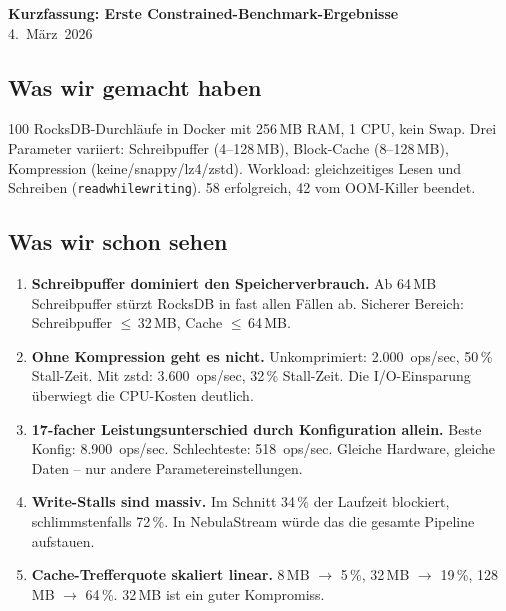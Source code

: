 \documentclass[11pt,a4paper]{scrartcl}
\begin{document}
\begin{center}
  {\Large\bfseries Kurzfassung: Erste Constrained-Benchmark-Ergebnisse}\\[4pt]
  {\normalsize 4.~März~2026}
\end{center}

\bigskip

\subsection*{Was wir gemacht haben}

100 RocksDB-Durchläufe in Docker mit 256\,MB RAM, 1 CPU, kein Swap.
Drei Parameter variiert: Schreibpuffer (4--128\,MB), Block-Cache (8--128\,MB),
Kompression (keine/snappy/lz4/zstd). Workload: gleichzeitiges Lesen und
Schreiben (\texttt{readwhilewriting}). 58 erfolgreich, 42 vom OOM-Killer
beendet.

\subsection*{Was wir schon sehen}

\begin{enumerate}[nosep]
  \item \textbf{Schreibpuffer dominiert den Speicherverbrauch.}
        Ab 64\,MB Schreibpuffer stürzt RocksDB in fast allen Fällen ab.
        Sicherer Bereich: Schreibpuffer $\leq$\,32\,MB, Cache $\leq$\,64\,MB.

  \item \textbf{Ohne Kompression geht es nicht.}
        Unkomprimiert: 2.000~ops/sec, 50\,\% Stall-Zeit.
        Mit zstd: 3.600~ops/sec, 32\,\% Stall-Zeit.
        Die I/O-Einsparung überwiegt die CPU-Kosten deutlich.

  \item \textbf{17-facher Leistungsunterschied durch Konfiguration allein.}
        Beste Konfig: 8.900~ops/sec. Schlechteste: 518~ops/sec.
        Gleiche Hardware, gleiche Daten -- nur andere Parametereinstellungen.

  \item \textbf{Write-Stalls sind massiv.}
        Im Schnitt 34\,\% der Laufzeit blockiert, schlimmstenfalls 72\,\%.
        In NebulaStream würde das die gesamte Pipeline aufstauen.

  \item \textbf{Cache-Trefferquote skaliert linear.}
        8\,MB $\rightarrow$ 5\,\%, 32\,MB $\rightarrow$ 19\,\%, 128\,MB $\rightarrow$ 64\,\%.
        32\,MB ist ein guter Kompromiss.
\end{enumerate}
\end{document}
